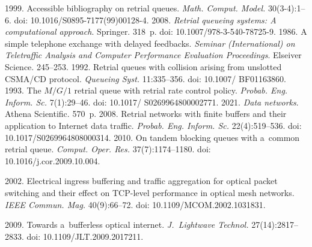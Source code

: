   \begin{multicols}{2}

\renewcommand{\bibname}{\protect\rmfamily References}

{\small\frenchspacing
 {%
 \begin{thebibliography}{99} 
 1999. Accessible bibliography on retrial queues. \textit{Math.
Comput. Model.} 30(3-4):1--6. doi: 10.1016/S0895-7177(99)00128-4.
 2008. 
\textit{Retrial queueing systems: A computational approach}. Springer. 318~p.
doi: 10.1007/978-3-540-78725-9.
 1986. 
A simple telephone exchange with delayed feedbacks. \textit{Seminar (International) on Teletraffic Analysis and Computer Performance Evaluation Proceedings}.
Elseiver Science. 245--253.
 1992. 
Retrial queues with collision arising from unslotted \mbox{CSMA}/CD protocol. \textit{Queueing Syst.} 11:335--356.  
doi: 10.1007/ BF01163860.
 1993. 
The $M/G/1$ retrial queue with retrial rate control policy.
\textit{Probab. Eng. Inform. Sc.} 7(1):29--46.
doi: 10.1017/ S0269964800002771.
 2021.
\textit{Data networks}. Athena Scientific. 570~p.
 2008.
Retrial networks with finite buffers and their application to Internet data traffic. \textit{Probab. Eng. Inform. Sc.} 22(4):519--536.
doi: 10.1017/S0269964808000314.
 2010.
On tandem blocking queues with a~common retrial queue. \textit{Comput. Oper. Res.} 37(7):1174--1180.
doi: 10.1016/j.cor.2009.10.004.

 2002.
Electrical ingress buffering and traffic aggregation for optical packet switching and their
effect on TCP-level performance in optical mesh networks.
\textit{IEEE Commun. Mag.} 40(9):66--72. doi: 10.1109/MCOM.2002.1031831.

 2009.
Towards a~bufferless optical internet.
\textit{J.~Lightwave Technol.} 27(14):2817--2833. doi: 10.1109/JLT.2009.2017211.


\end{thebibliography}}}
\end{multicols}
